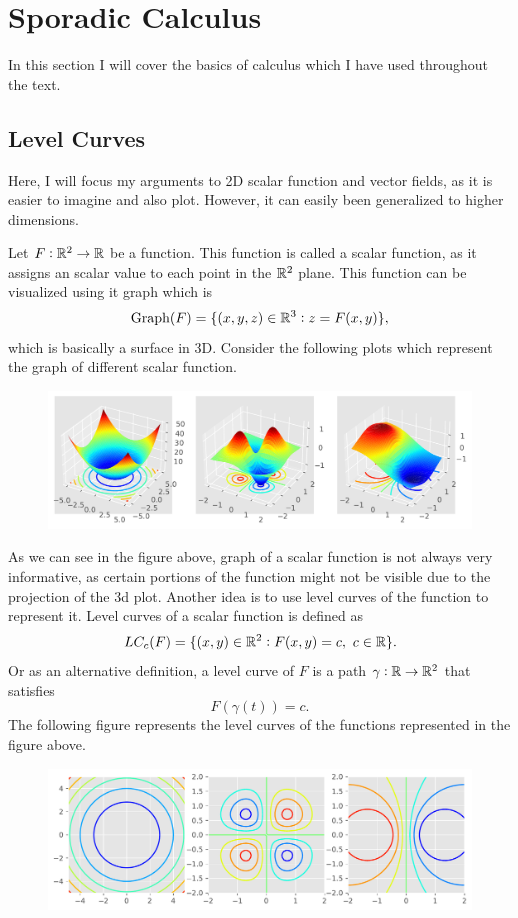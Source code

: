 \section{Sporadic Calculus}

In this section I will cover the basics of calculus which I have used throughout the text. 

\subsection{Level Curves}
Here, I will focus my arguments to 2D scalar function and vector fields, as it is easier to imagine and also plot. However, it can easily been generalized to higher dimensions. 

Let $F: \mathbb{R}^2 \to \mathbb{R}$ be a function. This function is called a scalar function, as it assigns an scalar value to each point in the $\mathbb{R}^2$ plane. This function can be visualized using it graph which is 
\[ \text{Graph}(F) = \{ (x,y,z) \in \mathbb{R}^3: z = F(x,y) \}, \]
which is basically a surface in 3D. Consider the following plots which represent the graph of different scalar function.

\begin{figure}[h!]
\centering
\includegraphics[width=1\linewidth]{Images/ScalarFunctions}
\end{figure}

As we can see in the figure above, graph of a scalar function is not always very informative, as certain portions of the function might not be visible due to the projection of the 3d plot. Another idea is to use level curves of the function to represent it. Level curves of a scalar function is defined as
\[ LC_c(F) = \{ (x,y)\in\mathbb{R}^2: F(x,y)=c,\ c\in \mathbb{R} \}. \]
Or as an alternative definition, a level curve of $F$ is a path $\gamma:\mathbb{R}\to\mathbb{R}^2$ that satisfies
\[ F(\gamma(t)) = c. \]
The following figure represents the level curves of the functions represented in the figure above.

\begin{figure}[h!]
	\centering
	\includegraphics[width=1\linewidth]{Images/ScalarFunctionsLevelCurves.pdf}
\end{figure}

